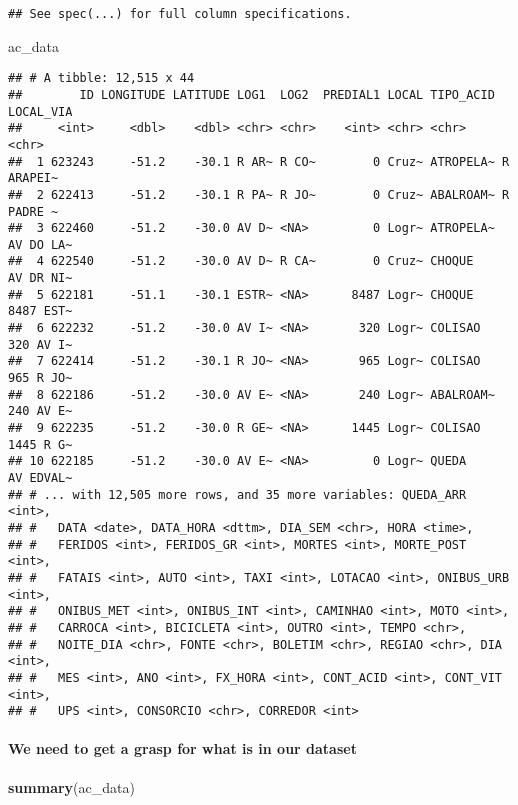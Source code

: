 \documentclass[]{article}
\newenvironment{Shaded}{\begin{snugshade}}{\end{snugshade}}
\newcommand{\KeywordTok}[1]{\textcolor[rgb]{0.13,0.29,0.53}{\textbf{#1}}}
\newcommand{\NormalTok}[1]{#1}
\let\oldparagraph\paragraph
\renewcommand{\paragraph}[1]{\oldparagraph{#1}\mbox{}}
\begin{document}
\begin{verbatim}
## See spec(...) for full column specifications.
\end{verbatim}

\begin{Shaded}
\begin{Highlighting}[]
\NormalTok{ac_data}
\end{Highlighting}
\end{Shaded}

\begin{verbatim}
## # A tibble: 12,515 x 44
##        ID LONGITUDE LATITUDE LOG1  LOG2  PREDIAL1 LOCAL TIPO_ACID LOCAL_VIA
##     <int>     <dbl>    <dbl> <chr> <chr>    <int> <chr> <chr>     <chr>    
##  1 623243     -51.2    -30.1 R AR~ R CO~        0 Cruz~ ATROPELA~ R ARAPEI~
##  2 622413     -51.2    -30.1 R PA~ R JO~        0 Cruz~ ABALROAM~ R PADRE ~
##  3 622460     -51.2    -30.0 AV D~ <NA>         0 Logr~ ATROPELA~ AV DO LA~
##  4 622540     -51.2    -30.0 AV D~ R CA~        0 Cruz~ CHOQUE    AV DR NI~
##  5 622181     -51.1    -30.1 ESTR~ <NA>      8487 Logr~ CHOQUE    8487 EST~
##  6 622232     -51.2    -30.0 AV I~ <NA>       320 Logr~ COLISAO   320 AV I~
##  7 622414     -51.2    -30.1 R JO~ <NA>       965 Logr~ COLISAO   965 R JO~
##  8 622186     -51.2    -30.0 AV E~ <NA>       240 Logr~ ABALROAM~ 240 AV E~
##  9 622235     -51.2    -30.0 R GE~ <NA>      1445 Logr~ COLISAO   1445 R G~
## 10 622185     -51.2    -30.0 AV E~ <NA>         0 Logr~ QUEDA     AV EDVAL~
## # ... with 12,505 more rows, and 35 more variables: QUEDA_ARR <int>,
## #   DATA <date>, DATA_HORA <dttm>, DIA_SEM <chr>, HORA <time>,
## #   FERIDOS <int>, FERIDOS_GR <int>, MORTES <int>, MORTE_POST <int>,
## #   FATAIS <int>, AUTO <int>, TAXI <int>, LOTACAO <int>, ONIBUS_URB <int>,
## #   ONIBUS_MET <int>, ONIBUS_INT <int>, CAMINHAO <int>, MOTO <int>,
## #   CARROCA <int>, BICICLETA <int>, OUTRO <int>, TEMPO <chr>,
## #   NOITE_DIA <chr>, FONTE <chr>, BOLETIM <chr>, REGIAO <chr>, DIA <int>,
## #   MES <int>, ANO <int>, FX_HORA <int>, CONT_ACID <int>, CONT_VIT <int>,
## #   UPS <int>, CONSORCIO <chr>, CORREDOR <int>
\end{verbatim}

\paragraph{We need to get a grasp for what is in our
dataset}\label{we-need-to-get-a-grasp-for-what-is-in-our-dataset}

\begin{Shaded}
\begin{Highlighting}[]
\KeywordTok{summary}\NormalTok{(ac_data)}
\end{Highlighting}
\end{Shaded}
\end{document}
